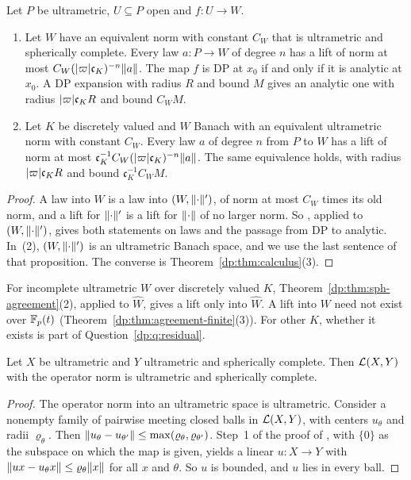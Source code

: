 \begin{theorem}\label{dp:thm:sph-agreement}
Let $P$ be ultrametric, $U\subseteq P$ open and $f\colon U\to W$.
\begin{enumerate}
\item Let $W$ have an equivalent norm with constant $C_W$ that is ultrametric and spherically complete. Every law $a\colon P\to W$ of degree $n$ has a lift of norm at most $C_W(\lvert \varpi\rvert\mathfrak c_K)^{-n}\lVert a\rVert$. The map $f$ is DP at $x_0$ if and only if it is analytic at $x_0$. A DP expansion with radius $R$ and bound $M$ gives an analytic one with radius $\lvert \varpi\rvert\mathfrak c_KR$ and bound $C_WM$.
\item Let $K$ be discretely valued and $W$ Banach with an equivalent ultrametric norm with constant $C_W$. Every law $a$ of degree $n$ from $P$ to $W$ has a lift of norm at most $\mathfrak c_K^{-1}C_W(\lvert \varpi\rvert\mathfrak c_K)^{-n}\lVert a\rVert$. The same equivalence holds, with radius $\lvert \varpi\rvert\mathfrak c_KR$ and bound $\mathfrak c_K^{-1}C_WM$.
\end{enumerate}
\end{theorem}

\begin{proof}
A law into $W$ is a law into $(W,\lVert \cdot\rVert')$, of norm at most $C_W$ times its old norm, and a lift for $\lVert \cdot\rVert'$ is a lift for $\lVert \cdot\rVert$ of no larger norm. So \cite[Proposition~14.40(1)]{I}, applied to $(W,\lVert \cdot\rVert')$, gives both statements on laws and the passage from DP to analytic. In~(2), $(W,\lVert \cdot\rVert')$ is an ultrametric Banach space, and we use the last sentence of that proposition. The converse is Theorem~\ref{dp:thm:calculus}(3).
\end{proof}

For incomplete ultrametric $W$ over discretely valued $K$, Theorem~\ref{dp:thm:sph-agreement}(2), applied to $\widehat W$, gives a lift only into $\widehat W$. A lift into $W$ need not exist over $\mathbb F_p(t)$ (Theorem~\ref{dp:thm:agreement-finite}(3)). For other $K$, whether it exists is part of Question~\ref{dp:q:residual}.

\begin{lemma}\label{dp:lem:operator-sph}
Let $X$ be ultrametric and $Y$ ultrametric and spherically complete. Then $\mathcal L(X,Y)$ with the operator norm is ultrametric and spherically complete.
\end{lemma}

\begin{proof}
The operator norm into an ultrametric space is ultrametric. Consider a nonempty family of pairwise meeting closed balls in $\mathcal L(X,Y)$, with centers $u_\theta$ and radii $\varrho_\theta$. Then $\lVert u_\theta-u_{\theta'}\rVert\le\max(\varrho_\theta,\varrho_{\theta'})$. Step~1 of the proof of \cite[Theorem~5.2]{I}, with $\{0\}$ as the subspace on which the map is given, yields a linear $u\colon X\to Y$ with $\lVert ux-u_\theta x\rVert\le\varrho_\theta\lVert x\rVert$ for all $x$ and $\theta$. So $u$ is bounded, and $u$ lies in every ball.
\end{proof}

